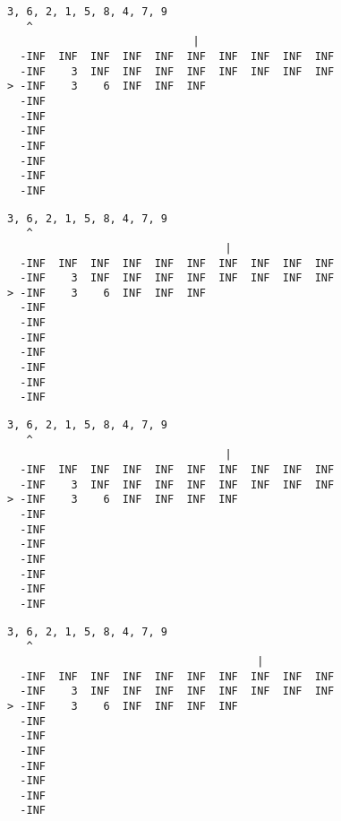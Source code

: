 { \begin{verbatim}
3, 6, 2, 1, 5, 8, 4, 7, 9
   ^
                             |
  -INF  INF  INF  INF  INF  INF  INF  INF  INF  INF
  -INF    3  INF  INF  INF  INF  INF  INF  INF  INF
> -INF    3    6  INF  INF  INF                    
  -INF                                             
  -INF                                             
  -INF                                             
  -INF                                             
  -INF                                             
  -INF                                             
  -INF                                             
\end{verbatim} }

{ \begin{verbatim}
3, 6, 2, 1, 5, 8, 4, 7, 9
   ^
                                  |
  -INF  INF  INF  INF  INF  INF  INF  INF  INF  INF
  -INF    3  INF  INF  INF  INF  INF  INF  INF  INF
> -INF    3    6  INF  INF  INF                    
  -INF                                             
  -INF                                             
  -INF                                             
  -INF                                             
  -INF                                             
  -INF                                             
  -INF                                             
\end{verbatim} }

{ \begin{verbatim}
3, 6, 2, 1, 5, 8, 4, 7, 9
   ^
                                  |
  -INF  INF  INF  INF  INF  INF  INF  INF  INF  INF
  -INF    3  INF  INF  INF  INF  INF  INF  INF  INF
> -INF    3    6  INF  INF  INF  INF               
  -INF                                             
  -INF                                             
  -INF                                             
  -INF                                             
  -INF                                             
  -INF                                             
  -INF                                             
\end{verbatim} }

{ \begin{verbatim}
3, 6, 2, 1, 5, 8, 4, 7, 9
   ^
                                       |
  -INF  INF  INF  INF  INF  INF  INF  INF  INF  INF
  -INF    3  INF  INF  INF  INF  INF  INF  INF  INF
> -INF    3    6  INF  INF  INF  INF               
  -INF                                             
  -INF                                             
  -INF                                             
  -INF                                             
  -INF                                             
  -INF                                             
  -INF                                             
\end{verbatim} }

